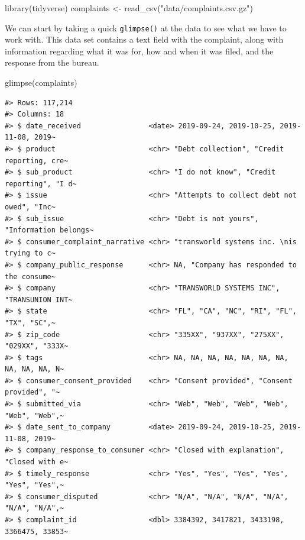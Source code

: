 \documentclass[
]{krantz}
\makeatletter
\newenvironment{Shaded}{\begin{snugshade}}{\end{snugshade}}
\newcommand{\FunctionTok}[1]{\textcolor[rgb]{0.00,0.00,0.00}{#1}}
\newcommand{\NormalTok}[1]{#1}
\newcommand{\OtherTok}[1]{\textcolor[rgb]{0.56,0.35,0.01}{#1}}
\newcommand{\StringTok}[1]{\textcolor[rgb]{0.31,0.60,0.02}{#1}}
\newenvironment{kframe}{%
\medskip{}
\setlength{\fboxsep}{.8em}
 \def\at@end@of@kframe{}%
 \ifinner\ifhmode%
  \def\at@end@of@kframe{\end{minipage}}%
  \begin{minipage}{\columnwidth}%
 \fi\fi%
 \def\FrameCommand##1{\hskip\@totalleftmargin \hskip-\fboxsep
 \colorbox{shadecolor}{##1}\hskip-\fboxsep
     \hskip-\linewidth \hskip-\@totalleftmargin \hskip\columnwidth}%
 \MakeFramed {\advance\hsize-\width
   \@totalleftmargin\z@ \linewidth\hsize
   \@setminipage}}%
 {\par\unskip\endMakeFramed%
 \at@end@of@kframe}
\renewenvironment{Shaded}{\begin{kframe}}{\end{kframe}}
\makeatother
\begin{document}
\begin{Shaded}
\begin{Highlighting}[]
\FunctionTok{library}\NormalTok{(tidyverse)}
\NormalTok{complaints }\OtherTok{\textless{}{-}} \FunctionTok{read\_csv}\NormalTok{(}\StringTok{"data/complaints.csv.gz"}\NormalTok{)}
\end{Highlighting}
\end{Shaded}

We can start by taking a quick \texttt{glimpse()} at the data to see what we have to work with. This data set contains a text field with the complaint, along with information regarding what it was for,
how and when it was filed, and the response from the bureau.

\begin{Shaded}
\begin{Highlighting}[]
\FunctionTok{glimpse}\NormalTok{(complaints)}
\end{Highlighting}
\end{Shaded}

\begin{verbatim}
#> Rows: 117,214
#> Columns: 18
#> $ date_received                <date> 2019-09-24, 2019-10-25, 2019-11-08, 2019~
#> $ product                      <chr> "Debt collection", "Credit reporting, cre~
#> $ sub_product                  <chr> "I do not know", "Credit reporting", "I d~
#> $ issue                        <chr> "Attempts to collect debt not owed", "Inc~
#> $ sub_issue                    <chr> "Debt is not yours", "Information belongs~
#> $ consumer_complaint_narrative <chr> "transworld systems inc. \nis trying to c~
#> $ company_public_response      <chr> NA, "Company has responded to the consume~
#> $ company                      <chr> "TRANSWORLD SYSTEMS INC", "TRANSUNION INT~
#> $ state                        <chr> "FL", "CA", "NC", "RI", "FL", "TX", "SC",~
#> $ zip_code                     <chr> "335XX", "937XX", "275XX", "029XX", "333X~
#> $ tags                         <chr> NA, NA, NA, NA, NA, NA, NA, NA, NA, NA, N~
#> $ consumer_consent_provided    <chr> "Consent provided", "Consent provided", "~
#> $ submitted_via                <chr> "Web", "Web", "Web", "Web", "Web", "Web",~
#> $ date_sent_to_company         <date> 2019-09-24, 2019-10-25, 2019-11-08, 2019~
#> $ company_response_to_consumer <chr> "Closed with explanation", "Closed with e~
#> $ timely_response              <chr> "Yes", "Yes", "Yes", "Yes", "Yes", "Yes",~
#> $ consumer_disputed            <chr> "N/A", "N/A", "N/A", "N/A", "N/A", "N/A",~
#> $ complaint_id                 <dbl> 3384392, 3417821, 3433198, 3366475, 33853~
\end{verbatim}
\end{document}
